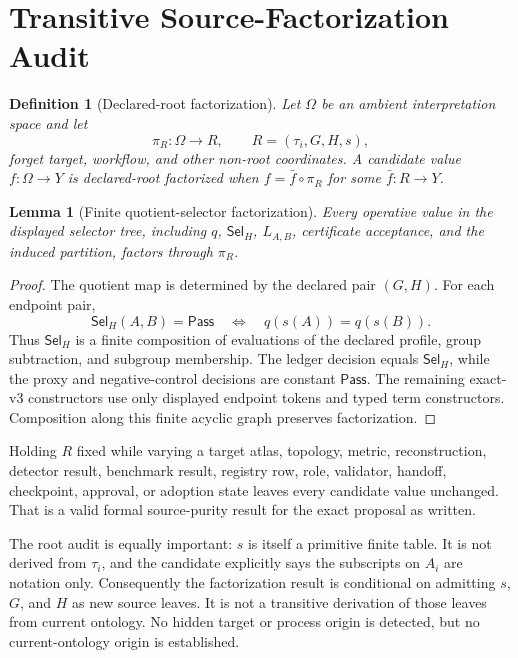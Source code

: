 \documentclass[11pt]{article}
\newtheorem{definition}{Definition}
\newtheorem{lemma}{Lemma}
\newcommand{\Pass}{\mathsf{Pass}}
\newcommand{\Sel}{\mathsf{Sel}_{H}}
\begin{document}
\section{Transitive Source-Factorization Audit}

\begin{definition}[Declared-root factorization]
Let \(\Omega\) be an ambient interpretation space and let
\[
 \pi_R:\Omega\to R,\qquad R=(\tau_i,G,H,s),
\]
forget target, workflow, and other non-root coordinates.  A candidate value
\(f:\Omega\to Y\) is declared-root factorized when
\(f=\bar f\circ\pi_R\) for some \(\bar f:R\to Y\).
\end{definition}

\begin{lemma}[Finite quotient-selector factorization]
Every operative value in the displayed selector tree, including
\(q\), \(\Sel\), \(L_{A,B}\), certificate acceptance, and the induced
partition, factors through \(\pi_R\).
\end{lemma}

\begin{proof}
The quotient map is determined by the declared pair \((G,H)\).
For each endpoint pair,
\[
 \Sel(A,B)=\Pass
 \quad\Longleftrightarrow\quad
 q(s(A))=q(s(B)).
\]
Thus \(\Sel\) is a finite composition of evaluations of the declared profile,
group subtraction, and subgroup membership.  The ledger decision equals
\(\Sel\), while the proxy and negative-control decisions are constant
\(\Pass\).  The remaining exact-v3 constructors use only displayed endpoint
tokens and typed term constructors.  Composition along this finite acyclic
graph preserves factorization.
\end{proof}

Holding \(R\) fixed while varying a target atlas, topology, metric,
reconstruction, detector result, benchmark result, registry row, role,
validator, handoff, checkpoint, approval, or adoption state leaves every
candidate value unchanged.  That is a valid formal source-purity result for
the exact proposal as written.

The root audit is equally important: \(s\) is itself a primitive finite table.
It is not derived from \(\tau_i\), and the candidate explicitly says the
subscripts on \(A_i\) are notation only.  Consequently the factorization
result is conditional on admitting \(s\), \(G\), and \(H\) as new source
leaves.  It is not a transitive derivation of those leaves from current
ontology.  No hidden target or process origin is detected, but no
current-ontology origin is established.
\end{document}
